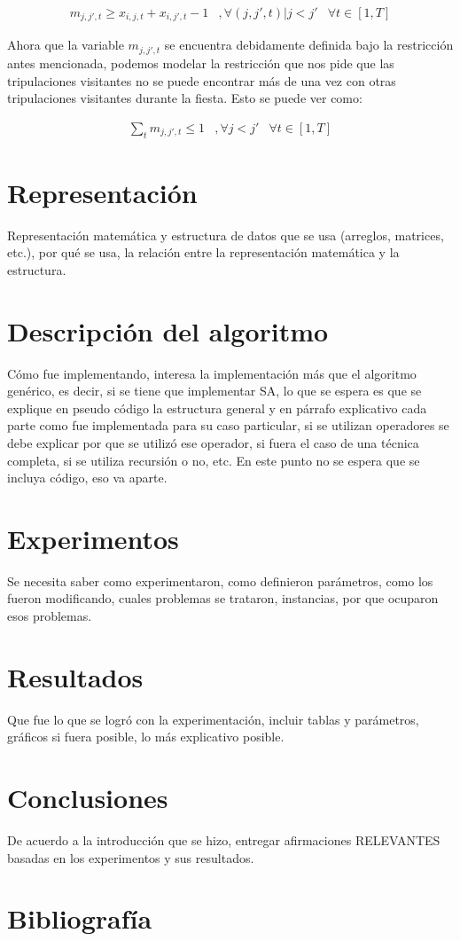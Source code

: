 \documentclass[letter, 10pt]{article}
\begin{document}
\begin{eqnarray}
m_{j,j',t} \geq x_{i,j,t} + x_{i,j',t} - 1 & , \forall(j,j',t)|j<j'& \forall t \in [1,T]
\end{eqnarray}

Ahora que la variable $m_{j,j',t}$ se encuentra debidamente definida bajo la restricción antes mencionada, podemos modelar la restricción que nos pide que las tripulaciones visitantes no se puede encontrar más de una vez con otras tripulaciones visitantes durante la fiesta. Esto se puede ver como:

\begin{eqnarray}
\sum_t m_{j,j',t} \leq 1 & , \forall j<j'& \forall t \in [1,T]
\end{eqnarray}

\section{Representación}
Representaci\'on matem\'atica y estructura de datos que se usa (arreglos, matrices, etc.), por qu\'e se usa, la relaci\'on entre la 
representaci\'on matem\'atica y la estructura.

\section{Descripción del algoritmo}
C\'omo fue implementando, interesa la implementaci\'on m\'as que el algoritmo gen\'erico, es decir,
si se tiene que implementar SA, lo que se espera es que se explique en pseudo c\'odigo la estructura
general y en p\'arrafo explicativo cada parte como fue implementada para su caso particular, si
se utilizan operadores se debe explicar por que se utiliz\'o ese operador, si fuera el caso de una
t\'ecnica completa, si se utiliza recursi\'on o no, etc. En este punto no se espera que se incluya
c\'odigo, eso va aparte.

\section{Experimentos}
Se necesita saber como experimentaron, como definieron par\'ametros, como los fueron modificando, cuales 
problemas se trataron, instancias, por que ocuparon esos problemas.

\section{Resultados}
Que fue lo que se logr\'o con la experimentaci\'on, incluir tablas y par\'ametros, gr\'aficos si fuera
posible, lo m\'as explicativo posible.

\section{Conclusiones}
De acuerdo a la introducci\'on que se hizo, entregar afirmaciones RELEVANTES basadas en los experimentos
y sus resultados.

\section{Bibliografía}


\end{document}
